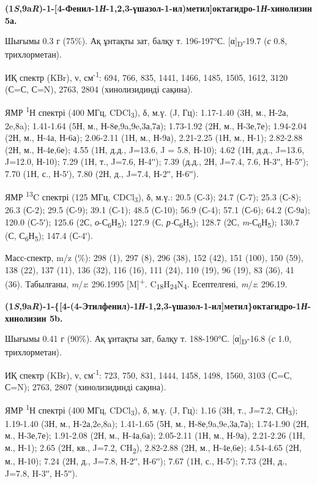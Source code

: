\begin{multicols}{2}
{\bfseries (1\emph{S},9a\emph{R})-1-{[}4-Фенил-1\emph{Н}-1,2,3-үшазол-1-ил)метил{]}октагидро-1\emph{Н}-хинолизин
5а.}

Шығымы 0.3 г (75\%). Ақ ұнтақты зат, балқу т. 196-197°С.
{[}α{]}\textsubscript{D}-19.7 (\emph{с} 0.8, трихлорметан).

ИҚ спектр (KBr), ν, см\textsuperscript{-1}: 694, 766, 835, 1441, 1466,
1485, 1505, 1612, 3120 (С=С, С=N), 2763, 2804 (хинолизидинді сақина).

ЯМР \textsuperscript{1}Н спектрі (400 МГц, CDCl\textsubscript{3}), δ,
м.ү. (J, Гц): 1.17-1.40 (3Н, м., Н-2а, 2e,8a); 1.41-1.64 (5Н, м.,
Н-8е,9a,9e,3а,7а); 1.73-1.92 (2Н, м., Н-3е,7е); 1.94-2.04 (2Н, м., Н-4а,
Н-6а); 2.06-2.11 (1Н, м., Н-9а), 2.21-2.25 (1Н, м., Н-1); 2.82-2.88 (2Н,
м., Н-4е,6е); 4.55 (1Н, д.д., J=13.6, J = 5.8, Н-10); 4.62 (1Н, д.д.,
J=13.6, J=12.0, Н-10); 7.29 (1Н, т., J=7.6, Н-4ʹʹ); 7.39 (д.д., 2Н,
J=7.4, 7.6, Н-3ʹʹ, Н-5ʹʹ); 7.70 (1Н, с., Н-5ʹ), 7.80 (2Н, д., J=7.4,
Н-2ʹʹ, Н-6ʹʹ).

ЯМР \textsuperscript{13}C спектрі (125 МГц, CDCl\textsubscript{3}), δ,
м.ү.: 20.5 (С-3); 24.7 (С-7); 25.3 (С-8); 26.3 (С-2); 29.5 (С-9); 39.1
(С-1); 48.5 (С-10); 56.9 (С-4); 57.1 (С-6); 64.2 (С-9а); 120.0 (С-5ʹ);
125.6 (2С, \emph{о}-С\textsubscript{6}Н\textsubscript{5}); 127.9 (С,
\emph{р-}С\textsubscript{6}Н\textsubscript{5}); 128.7 (2С,
\emph{m}-С\textsubscript{6}Н\textsubscript{5}); 130.7 (С,
С\textsubscript{6}Н\textsubscript{5}); 147.4 (С-4ʹ).

Масс-спектр, m/z (\%): 298 (1), 297 (8), 296 (38), 152 (42), 151 (100),
150 (59), 138 (22), 137 (11), 136 (32), 116 (16), 111 (24), 110 (19), 96
(19), 83 (36), 41 (36). Табылғаны, \emph{m}/\emph{z}: 296.1995
{[}M{]}\textsuperscript{+}.
C\textsubscript{18}H\textsubscript{24}N\textsubscript{4}. Есептелгені,
\emph{m}/\emph{z}: 296.19.

{\bfseries (1\emph{S},9a\emph{R})-1-\{{[}4-(4-Этилфенил)-1\emph{Н}-1,2,3-үшазол-1-ил{]}метил\}октагидро-1\emph{Н}-хинолизин
5b.}

Шығымы 0.41 г (90\%). Ақ ұнтақты зат, балқу т. 188-190°С.
{[}α{]}\textsubscript{D}-16.8 (\emph{с} 1.0, трихлорметан).

ИҚ спектр (KBr), ν, см\textsuperscript{-1}: 723, 750, 831, 1444, 1458,
1498, 1560, 3103 (С=С, С=N); 2763, 2807 (хинолизидинді сақина).

ЯМР \textsuperscript{1}Н спектрі (400 МГц, CDCl\textsubscript{3}), δ,
м.ү. (J, Гц): 1.16 (3Н, т., J=7.2, СН\textsubscript{3}); 1.19-1.40 (3Н,
м., Н-2а,2e,8a); 1.41-1.65 (5Н, м., Н-8е,9a,9e,3а,7а); 1.74-1.90 (2Н,
м., Н-3е,7е); 1.91-2.08 (2Н, м., Н-4а,6а); 2.05-2.11 (1Н, м., Н-9а),
2.21-2.26 (1H, м., Н-1); 2.65 (2Н, кв., J=7.2, CH\textsubscript{2}),
2.82-2.88 (2Н, м., Н-4е,6е); 4.54-4.65 (2Н, м., Н-10); 7.24 (2Н, д.,
J=7.8, Н-2ʹʹ, Н-6ʹʹ); 7.67 (1Н, с., Н-5ʹ); 7.73 (2Н, д., J=7.8, H-3ʹʹ,
Н-5ʹʹ).


\end{multicols}
